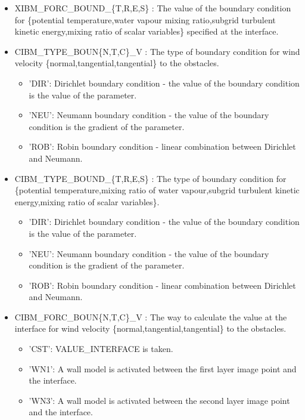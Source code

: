 \begin{itemize}
\item XIBM\_FORC\_BOUND\_\{T,R,E,S\} :
The value of the boundary condition for \{potential temperature,water
vapour mixing ratio,subgrid turbulent kinetic energy,mixing ratio of
scalar variables\} specified at the interface. 

\item CIBM\_TYPE\_BOUN\{N,T,C\}\_V :
The type of boundary condition for wind velocity \{normal,tangential,tangential\} to the obstacles.
\begin{itemize}
\item 'DIR': Dirichlet boundary condition - the value of the boundary
  condition is the value of the parameter.
\item 'NEU': Neumann boundary condition - the value of the boundary condition
  is the gradient of the parameter.
\item 'ROB': Robin boundary condition - linear combination between Dirichlet and Neumann.
\end{itemize}
  
\item CIBM\_TYPE\_BOUND\_\{T,R,E,S\} :
The type of boundary condition for \{potential temperature,mixing
ratio of water vapour,subgrid turbulent kinetic energy,mixing ratio of scalar variables\}.  
\begin{itemize}
\item 'DIR': Dirichlet boundary condition - the value of the boundary
condition is the value of the parameter.
\item 'NEU': Neumann boundary condition - the value of the boundary condition
is the gradient of the parameter.
\item 'ROB': Robin boundary condition - linear combination between Dirichlet and Neumann.
\end{itemize}

\item CIBM\_FORC\_BOUN\{N,T,C\}\_V :
The way to calculate the value at the interface for wind velocity
\{normal,tangential,tangential\} to the obstacles.
\begin{itemize}
\item 'CST': VALUE\_INTERFACE is taken.
\item 'WN1': A wall model is activated between the first layer image point and the interface.
\item 'WN3': A wall model is activated between the second layer image point and the interface.
\end{itemize}


\end{itemize}
